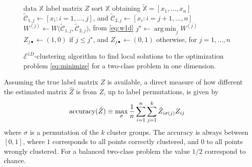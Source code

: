 \documentclass[aps,preprint,nofootinbib,floatfix]{revtex4-1}
\DeclareMathOperator*{\argmin}{arg\,min}
\newcommand\C{{\mathcal{C}}}
\newcommand\tC{{\widetilde{\C}}}
\begin{document}
\begin{figure}
\begin{flushleft}
\begin{algorithm}[H]
\vspace{.5em}
\begin{algorithmic}[1]
\INPUT data $\mathbb{X}$
\OUTPUT label matrix $Z$
\STATE sort $\mathbb{X}$ obtaining 
$\widetilde{\mathbb{X}}= [ x_1,\dotsc,x_n ]$
        \STATE $\tC_{1,j} \leftarrow [x_i: i=1,\dotsc,j]$, and 
                $\tC_{2,j} \leftarrow [x_i : i=j+1,\dotsc,n]$
        \STATE  
            $W^{(j)} \leftarrow W \big( \tC_{1,j},\tC_{2,j}\big)$, 
            from \eqref{eq:w1d}
    \ENDFOR
    \STATE $j^\star \leftarrow \argmin_j W^{(j)}$ 
    \STATE $Z_{j\bullet} \leftarrow (1,0) $ if $j\le j^\star$, and
           $Z_{j\bullet} \leftarrow (0,1)$ otherwise, for $j=1,\dotsc,n$
\end{algorithmic}
\caption{
\label{algo1d}
$\mathcal{E}^{1D}$-clustering algorithm to
find local solutions to the optimization 
problem \eqref{eq:minimize} 
for a two-class problem in one dimension. \hspace{\fill}
}
\end{algorithm}
\end{flushleft}
\end{figure}

Assuming the true label matrix $Z$ is available, a direct
measure of how different the estimated matrix $\hat{Z}$ 
is from $Z$, up to label
permutations, is given by
\begin{equation}
\label{eq:accuracy}
\textnormal{accuracy}(\hat{Z}) \equiv \max_\sigma
\dfrac{1}{n}\sum_{i=1}^n\sum_{j=1}^k \hat{Z}_{i \sigma(j)} Z_{ij}
\end{equation}
where $\sigma$ is a permutation
of the $k$ cluster groups. 
The accuracy is always between $[0,1]$, where
$1$ corresponds to all points correctly clustered, and 
$0$ to all points wrongly clustered.
For a balanced two-class problem the value $1/2$ correspond
to chance.
\end{document}
